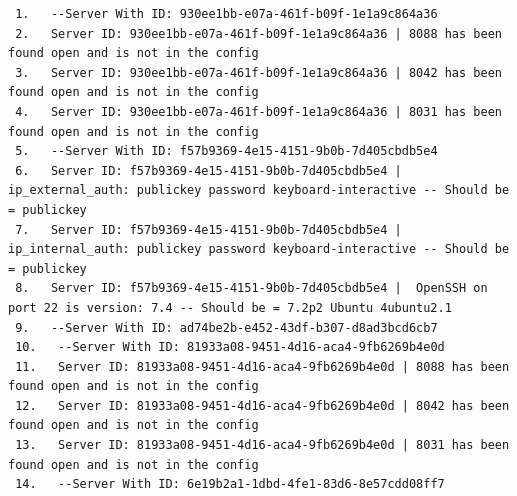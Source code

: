 \documentclass[12pt]{article}
\begin{document}
\begin{table}[htb]
\centering
\caption{Slack Ouput Breakdown}
\label{Slack Ouput Breakdown}
\end{table}

\newpage

\begin{mdframed}
\begin{lstlisting}
 1.   --Server With ID: 930ee1bb-e07a-461f-b09f-1e1a9c864a36
 2.   Server ID: 930ee1bb-e07a-461f-b09f-1e1a9c864a36 | 8088 has been found open and is not in the config
 3.   Server ID: 930ee1bb-e07a-461f-b09f-1e1a9c864a36 | 8042 has been found open and is not in the config
 4.   Server ID: 930ee1bb-e07a-461f-b09f-1e1a9c864a36 | 8031 has been found open and is not in the config
 5.   --Server With ID: f57b9369-4e15-4151-9b0b-7d405cbdb5e4
 6.   Server ID: f57b9369-4e15-4151-9b0b-7d405cbdb5e4 |  ip_external_auth: publickey password keyboard-interactive -- Should be = publickey
 7.   Server ID: f57b9369-4e15-4151-9b0b-7d405cbdb5e4 |  ip_internal_auth: publickey password keyboard-interactive -- Should be = publickey
 8.   Server ID: f57b9369-4e15-4151-9b0b-7d405cbdb5e4 |  OpenSSH on port 22 is version: 7.4 -- Should be = 7.2p2 Ubuntu 4ubuntu2.1
 9.   --Server With ID: ad74be2b-e452-43df-b307-d8ad3bcd6cb7
 10.   --Server With ID: 81933a08-9451-4d16-aca4-9fb6269b4e0d
 11.   Server ID: 81933a08-9451-4d16-aca4-9fb6269b4e0d | 8088 has been found open and is not in the config
 12.   Server ID: 81933a08-9451-4d16-aca4-9fb6269b4e0d | 8042 has been found open and is not in the config
 13.   Server ID: 81933a08-9451-4d16-aca4-9fb6269b4e0d | 8031 has been found open and is not in the config
 14.   --Server With ID: 6e19b2a1-1dbd-4fe1-83d6-8e57cdd08ff7
\end{lstlisting}
\end{mdframed}
\end{document}
